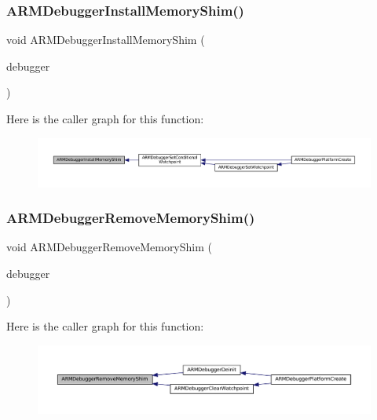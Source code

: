 \subsubsection{\texorpdfstring{A\+R\+M\+Debugger\+Install\+Memory\+Shim()}{ARMDebuggerInstallMemoryShim()}}
{\footnotesize\ttfamily void A\+R\+M\+Debugger\+Install\+Memory\+Shim (\begin{DoxyParamCaption}\item[{struct A\+R\+M\+Debugger $\ast$}]{debugger }\end{DoxyParamCaption})}

Here is the caller graph for this function\+:
\nopagebreak
\begin{figure}[H]
\begin{center}
\leavevmode
\includegraphics[width=350pt]{arm_2debugger_2memory-debugger_8c_aca7f028f215a0ba438cbbeb1078619cc_icgraph}
\end{center}
\end{figure}
\mbox{\label{arm_2debugger_2memory-debugger_8c_a992becb15eac2fbba9cae6d17ae396ff}} 
\subsubsection{\texorpdfstring{A\+R\+M\+Debugger\+Remove\+Memory\+Shim()}{ARMDebuggerRemoveMemoryShim()}}
{\footnotesize\ttfamily void A\+R\+M\+Debugger\+Remove\+Memory\+Shim (\begin{DoxyParamCaption}\item[{struct A\+R\+M\+Debugger $\ast$}]{debugger }\end{DoxyParamCaption})}

Here is the caller graph for this function\+:
\nopagebreak
\begin{figure}[H]
\begin{center}
\leavevmode
\includegraphics[width=350pt]{arm_2debugger_2memory-debugger_8c_a992becb15eac2fbba9cae6d17ae396ff_icgraph}
\end{center}
\end{figure}
